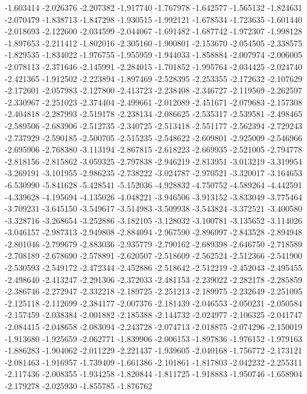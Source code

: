 -1.603414
-2.026376
-2.207382
-1.917740
-1.767978
-1.642577
-1.565132
-1.824631
-2.070479
-1.838713
-1.847298
-1.930515
-1.992121
-1.678534
-1.723635
-1.601440
-2.018693
-2.122600
-2.034599
-2.044067
-1.691482
-1.687742
-1.972307
-1.998128
-1.897653
-2.211412
-1.802016
-2.305160
-1.900801
-2.153670
-2.054505
-2.338575
-1.829535
-1.834022
-1.976755
-1.955959
-1.944033
-1.858884
-2.007974
-2.006005
-2.078113
-2.371646
-2.145991
-2.284015
-1.701852
-1.995764
-2.034425
-2.024740
-2.421365
-1.912502
-2.223894
-1.897469
-2.528395
-2.253355
-2.172632
-2.107629
-2.172601
-2.057983
-2.127800
-2.413723
-2.238408
-2.346727
-2.119569
-2.262597
-2.330967
-2.251023
-2.374404
-2.499661
-2.012089
-2.451671
-2.079683
-2.157308
-2.404818
-2.287993
-2.519178
-2.238134
-2.086625
-2.535317
-2.539581
-2.498465
-2.589506
-2.683906
-2.512735
-2.340725
-2.513418
-2.551177
-2.562394
-2.729243
-2.737929
-2.590185
-2.500705
-2.515235
-2.548622
-2.609801
-2.925009
-2.546966
-2.695906
-2.768380
-3.113194
-2.867815
-2.618223
-2.669935
-2.521005
-2.794778
-2.818156
-2.815862
-3.059325
-2.797838
-2.946219
-2.813951
-3.013219
-3.319954
-3.269191
-3.101955
-2.986235
-2.738222
-3.024787
-2.970521
-3.320017
-3.164653
-6.530990
-5.841628
-5.428541
-5.152036
-4.928832
-4.750752
-4.589264
-4.442591
-4.339628
-4.195694
-4.135026
-4.048221
-3.946506
-3.913152
-3.833049
-3.775464
-3.709231
-3.645150
-3.549617
-3.514983
-3.509938
-3.543824
-3.372521
-3.400580
-3.328716
-3.268654
-3.252886
-3.182105
-3.128032
-3.100781
-3.135652
-3.114026
-3.046157
-2.987313
-2.949808
-2.884094
-2.967590
-2.896997
-2.843528
-2.894948
-2.801046
-2.799679
-2.883036
-2.935779
-2.790162
-2.689398
-2.646750
-2.718589
-2.708189
-2.678690
-2.578891
-2.620507
-2.518609
-2.562524
-2.512366
-2.541900
-2.530593
-2.549172
-2.472344
-2.452886
-2.518642
-2.512219
-2.452043
-2.495455
-2.498640
-2.413247
-2.291306
-2.372033
-2.481153
-2.239022
-2.282178
-2.285859
-2.386746
-2.272947
-2.332218
-2.189725
-2.251213
-2.189975
-2.232649
-2.251095
-2.125118
-2.112699
-2.384177
-2.007376
-2.181439
-2.046553
-2.050231
-2.050584
-2.157459
-2.038384
-2.001882
-2.185388
-2.144732
-2.024977
-2.106325
-2.041747
-2.084415
-2.048658
-2.083094
-2.243728
-2.074713
-2.018875
-2.074296
-2.150019
-1.913680
-1.925659
-2.062771
-1.839906
-2.006153
-1.897836
-1.976152
-1.979163
-1.886283
-1.904062
-2.011229
-2.221437
-1.939605
-2.040168
-1.756772
-2.173121
-2.081463
-1.916957
-1.739409
-1.661386
-2.101861
-1.817803
-2.042232
-2.255311
-2.117436
-2.008355
-1.934258
-1.820844
-1.811725
-1.918883
-1.950746
-1.658904
-2.179278
-2.025930
-1.855785
-1.876762
